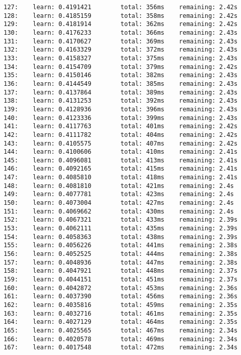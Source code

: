 \documentclass[11pt]{article}
\begin{document}
\begin{Verbatim}[commandchars=\\\{\}]
127:    learn: 0.4191421        total: 356ms    remaining: 2.42s
128:    learn: 0.4185159        total: 358ms    remaining: 2.42s
129:    learn: 0.4181914        total: 362ms    remaining: 2.42s
130:    learn: 0.4176233        total: 366ms    remaining: 2.43s
131:    learn: 0.4170627        total: 369ms    remaining: 2.43s
132:    learn: 0.4163329        total: 372ms    remaining: 2.43s
133:    learn: 0.4158327        total: 375ms    remaining: 2.43s
134:    learn: 0.4154709        total: 379ms    remaining: 2.42s
135:    learn: 0.4150146        total: 382ms    remaining: 2.43s
136:    learn: 0.4144549        total: 385ms    remaining: 2.43s
137:    learn: 0.4137864        total: 389ms    remaining: 2.43s
138:    learn: 0.4131253        total: 392ms    remaining: 2.43s
139:    learn: 0.4128936        total: 396ms    remaining: 2.43s
140:    learn: 0.4123336        total: 399ms    remaining: 2.43s
141:    learn: 0.4117763        total: 401ms    remaining: 2.42s
142:    learn: 0.4111782        total: 404ms    remaining: 2.42s
143:    learn: 0.4105575        total: 407ms    remaining: 2.42s
144:    learn: 0.4100606        total: 410ms    remaining: 2.41s
145:    learn: 0.4096081        total: 413ms    remaining: 2.41s
146:    learn: 0.4092165        total: 415ms    remaining: 2.41s
147:    learn: 0.4085810        total: 418ms    remaining: 2.41s
148:    learn: 0.4081810        total: 421ms    remaining: 2.4s
149:    learn: 0.4077781        total: 423ms    remaining: 2.4s
150:    learn: 0.4073004        total: 427ms    remaining: 2.4s
151:    learn: 0.4069662        total: 430ms    remaining: 2.4s
152:    learn: 0.4067321        total: 433ms    remaining: 2.39s
153:    learn: 0.4062111        total: 435ms    remaining: 2.39s
154:    learn: 0.4058363        total: 438ms    remaining: 2.39s
155:    learn: 0.4056226        total: 441ms    remaining: 2.38s
156:    learn: 0.4052525        total: 444ms    remaining: 2.38s
157:    learn: 0.4048936        total: 447ms    remaining: 2.38s
158:    learn: 0.4047921        total: 448ms    remaining: 2.37s
159:    learn: 0.4044151        total: 451ms    remaining: 2.37s
160:    learn: 0.4042872        total: 453ms    remaining: 2.36s
161:    learn: 0.4037390        total: 456ms    remaining: 2.36s
162:    learn: 0.4035816        total: 459ms    remaining: 2.35s
163:    learn: 0.4032716        total: 461ms    remaining: 2.35s
164:    learn: 0.4027129        total: 464ms    remaining: 2.35s
165:    learn: 0.4025565        total: 467ms    remaining: 2.34s
166:    learn: 0.4020578        total: 469ms    remaining: 2.34s
167:    learn: 0.4017548        total: 472ms    remaining: 2.34s

\end{Verbatim}
\end{document}

